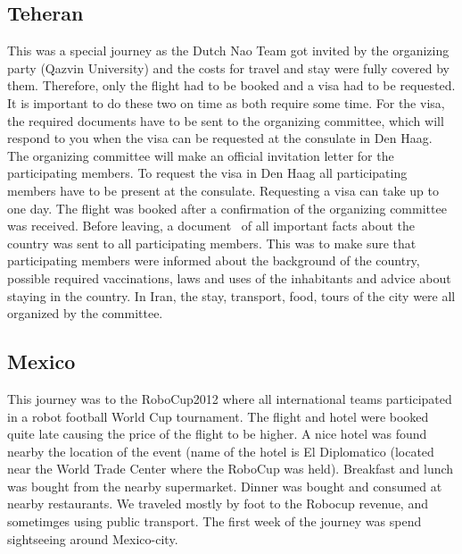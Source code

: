 \documentclass[a4paper]{article}
\begin{document}
\subsection{Teheran}
This was a special journey as the Dutch Nao Team got invited by the organizing party (Qazvin University) and the costs for travel and stay were fully covered by them. Therefore, only the flight had to be booked and a visa had to be requested. It is important to do these two on time as both require some time. For the visa, the required documents have to be sent to the organizing committee, which will respond to you when the visa can be requested at the consulate in Den Haag. The organizing committee will make an official invitation letter for the participating members. To request the visa in Den Haag all participating members have to be present at the consulate. Requesting a visa can take up to one day. The flight was booked after a confirmation of the organizing committee was received. Before leaving, a document~\cite{Verschoor2012Iran} of all important facts about the country was sent to all participating members. This was to make sure that participating members were informed about the background of the country, possible required vaccinations, laws and uses of the inhabitants and advice about staying in the country. In Iran, the stay, transport, food, tours of the city were all organized by the committee. 

\subsection{Mexico}
This journey was to the RoboCup2012 where all international teams participated in a robot football World Cup tournament. The flight and hotel were booked quite late causing the price of the flight to be higher. A nice hotel was found nearby the location of the event (name of the hotel is El Diplomatico (located near the World Trade Center where the RoboCup was held). Breakfast and lunch was bought from the nearby supermarket. Dinner was bought and consumed at nearby restaurants. We traveled mostly by foot to the Robocup revenue, and sometimges using public transport. The first week of the journey was spend sightseeing around Mexico-city.
\end{document}
